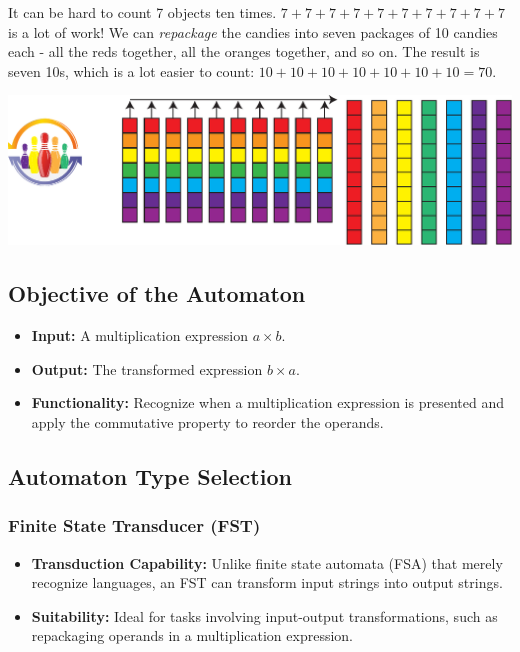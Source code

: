 \documentclass[11pt]{article}
\begin{document}
It can be hard to count 7 objects ten times. $7+7+7+7+7+7+7+7+7+7$ is a lot of work! We can \textit{repackage} the candies into seven packages of 10 candies each - all the reds together, all the oranges together, and so on. The result is seven 10s, which is a lot easier to count: $10+10+10+10+10+10+10=70$. 

\includegraphics[width=.9\textwidth]{./images/Easy_Pictures/SMR_MULT_Repackaging/PDF/SMR_MULT_Repackaging.pdf}
\subsection*{Objective of the Automaton}
\begin{itemize}
    \item \textbf{Input:} A multiplication expression \( a \times b \).
    \item \textbf{Output:} The transformed expression \( b \times a \).
    \item \textbf{Functionality:} Recognize when a multiplication expression is presented and apply the commutative property to reorder the operands.
\end{itemize}

\subsection*{Automaton Type Selection}

\subsubsection*{Finite State Transducer (FST)}
\begin{itemize}
    \item \textbf{Transduction Capability:} Unlike finite state automata (FSA) that merely recognize languages, an FST can transform input strings into output strings.
    \item \textbf{Suitability:} Ideal for tasks involving input-output transformations, such as repackaging operands in a multiplication expression.
\end{itemize}
\end{document}
